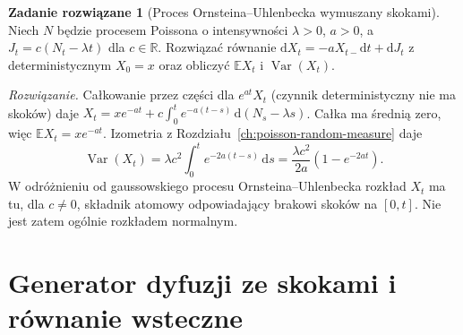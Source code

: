 \documentclass[11pt,a4paper,oneside]{report}
\numberwithin{equation}{chapter}
\theoremstyle{plain}
\theoremstyle{definition}
\newtheorem{zadanie}{Zadanie rozwiązane}[chapter]
\theoremstyle{remark}
\newcommand{\R}{\mathbb{R}}
\newcommand{\E}{\mathbb{E}}
\newcommand{\Var}{\operatorname{Var}}
\newcommand{\dd}{\mathrm{d}}
\begin{document}
\begin{zadanie}[Proces Ornsteina--Uhlenbecka wymuszany skokami]
Niech $N$ będzie procesem Poissona o intensywności
$\lambda>0$, $a>0$, a $J_t=c(N_t-\lambda t)$ dla
$c\in\R$. Rozwiązać równanie
$\dd X_t=-aX_{t-}\dd t+\dd J_t$ z deterministycznym
$X_0=x$ oraz obliczyć $\E X_t$ i $\Var(X_t)$.

\emph{Rozwiązanie.} Całkowanie przez części dla
$e^{at}X_t$ (czynnik deterministyczny nie ma skoków)
daje
$X_t=xe^{-at}+c\int_0^te^{-a(t-s)}\,\dd(N_s-\lambda s)$.
Całka ma średnią zero, więc $\E X_t=xe^{-at}$.
Izometria z Rozdziału~\ref{ch:poisson-random-measure} daje
\[
\Var(X_t)=\lambda c^2\int_0^t e^{-2a(t-s)}\,\dd s
=\frac{\lambda c^2}{2a}(1-e^{-2at}).
\]
W odróżnieniu od gaussowskiego procesu
Ornsteina--Uhlenbecka rozkład $X_t$ ma tu, dla
$c\ne0$, składnik atomowy odpowiadający brakowi skoków
na $[0,t]$. Nie jest zatem ogólnie rozkładem normalnym.
\end{zadanie}

\section{Generator dyfuzji ze skokami i równanie wsteczne}\label{sec:volIII:12:07}
\end{document}
